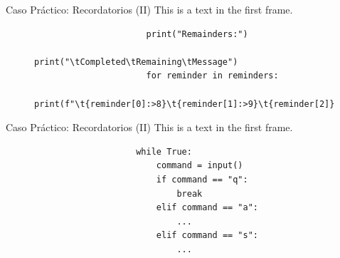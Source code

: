 \documentclass{beamer}
\begin{document}
    \begin{frame}[fragile]{Caso Práctico: Recordatorios (II)}
        This is a text in the first frame.
        \begin{figure}
            \begin{minipage}[c]{0.7\textwidth}
                \begin{verbatim}
                      print("Remainders:")
                      print("\tCompleted\tRemaining\tMessage")
                      for reminder in reminders:
                          print(f"\t{reminder[0]:>8}\t{reminder[1]:>9}\t{reminder[2]}")
                \end{verbatim}
            \end{minipage}
        \end{figure}
    \end{frame}

    \begin{frame}[fragile]{Caso Práctico: Recordatorios (II)}
        This is a text in the first frame.
        \begin{figure}
            \begin{minipage}[c]{0.7\textwidth}
                \begin{verbatim}
                    while True:
                        command = input()
                        if command == "q":
                            break
                        elif command == "a":
                            ...
                        elif command == "s":
                            ...
                \end{verbatim}
            \end{minipage}
        \end{figure}
    \end{frame}
\end{document}
